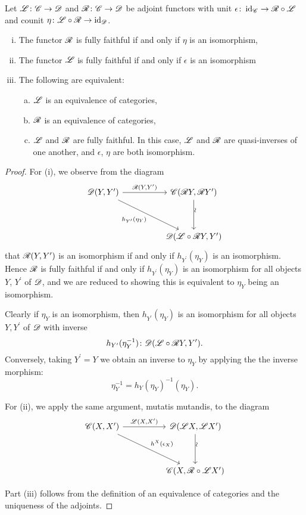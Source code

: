 \documentclass[10pt]{amsart}
\begin{document}
\begin{prop}
  Let $\mathscr{L} \colon \mathscr{C} \to \mathscr{D}$ and $\mathscr{R} \colon \mathscr{C} \to \mathscr{D}$ be adjoint functors with unit $\epsilon \colon \operatorname{id}_{\mathscr{C}} \to \mathscr{R} \circ \mathscr{L}$ and counit $\eta \colon \mathscr{L} \circ \mathscr{R} \to \operatorname{id}_{\mathscr{D}}$.
  \begin{enumerate}[(i)]
  \item
    The functor $\mathscr{R}$ is fully faithful if and only if $\eta$ is an isomorphism,
  \item
    The functor $\mathscr{L}$ is fully faithful if and only if $\epsilon$ is an isomorphism
  \item
    The following are equivalent:
    \begin{enumerate}[(a)]
    \item
      $\mathscr{L}$ is an equivalence of categories,
    \item
      $\mathscr{R}$ is an equivalence of categories,
    \item
      $\mathscr{L}$ and $\mathscr{R}$ are fully faithful.
      In this case, $\mathscr{L}$ and $\mathscr{R}$ are quasi-inverses of one another, and $\epsilon$, $\eta$ are both isomorphism.
    \end{enumerate}
  \end{enumerate}
  
  \begin{proof}
    For (i), we observe from the diagram
    $$\begin{tikzcd}
      \D(Y, Y^\prime) \arrow[swap]{rrdd}{h_{Y^\prime}(\eta_Y)}\arrow{rr}{\RA(Y,Y^\prime)} && \C(\RA Y, \RA Y^\prime)\arrow{dd}[rotate=90,yshift=-0.5 ex]{\sim}\\
      \\
      && \D(\LA \circ \RA Y, Y^\prime)
    \end{tikzcd}$$
    that $\mathscr{R}(Y,Y^\prime)$ is an isomorphism if and only if $h_{Y^\prime}(\eta_Y)$ is an isomorphism.
    Hence $\mathscr{R}$ is fully faithful if and only if $h_{Y^\prime}(\eta_Y)$ is an isomorphism for all objects $Y$, $Y^\prime$ of $\mathscr{D}$, and we are reduced to showing this is equivalent to $\eta_Y$ being an isomorphism.
    
    Clearly if $\eta_Y$ is an isomorphism, then $h_{Y^\prime}(\eta_Y)$ is an isomorphism for all objects $Y, Y^\prime$ of $\mathscr{D}$ with inverse
    $$h_{Y^\prime}(\eta_Y^{-1}) \colon \mathscr{D}(\mathscr{L} \circ \mathscr{R} Y, Y^\prime).$$
    Conversely, taking $Y^\prime = Y$ we obtain an inverse to $\eta_Y$ by applying the the inverse morphism:
    $$\eta_Y^{-1} = h_{Y}(\eta_Y)^{-1}(\eta_Y).$$
    
    For (ii), we apply the same argument, mutatis mutandis, to the diagram
    $$\begin{tikzcd}
      \C(X,X^\prime) \arrow{rrdd}{h^X(\epsilon_X)}\arrow{rr}{\LA(X,X^\prime)} && \D(\LA X, \LA X^\prime)\arrow{dd}[rotate=90,yshift=-.5ex]{\sim}\\
      \\
      && \C(X, \RA \circ \LA X^\prime)
    \end{tikzcd}$$
    
    Part (iii) follows from the definition of an equivalence of categories and the uniqueness of the adjoints.
  \end{proof}
\end{prop}
\end{document}
